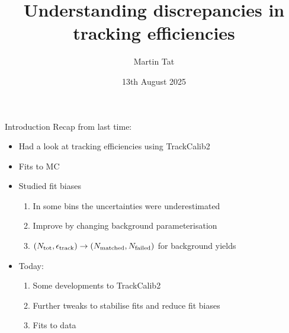 \documentclass[xcolor={dvipsnames}]{beamer}
\title[Heidelberg tracking meeting]{Understanding discrepancies in tracking efficiencies}
\author[Martin Tat]{Martin Tat}
\institute[Heidelberg]{Heidelberg University}
\date{13th August 2025}
\begin{document}
\begin{frame}
  \titlepage
\end{frame}


\begin{frame}{Introduction}
  \vspace{0.0cm}
  {\Large Recap from last time:}
  \vspace{0.2cm}
  \begin{itemize}
    \setlength\itemsep{0.8em}
    \item{Had a look at tracking efficiencies using TrackCalib2}
    \item{Fits to MC}
    \item{Studied fit biases}
    \begin{enumerate}
      \item{In some bins the uncertainties were underestimated}
      \item{Improve by changing background parameterisation}
      \item{$(N_{\rm tot}, \epsilon_{\rm track})\to(N_{\rm matched}, N_{\rm failed})$ for background yields}
    \end{enumerate}
    \item{Today:}
    \begin{enumerate}
      \item{Some developments to TrackCalib2}
      \item{Further tweaks to stabilise fits and reduce fit biases}
      \item{Fits to data}
    \end{enumerate}
  \end{itemize}
\end{frame}
\end{document}
